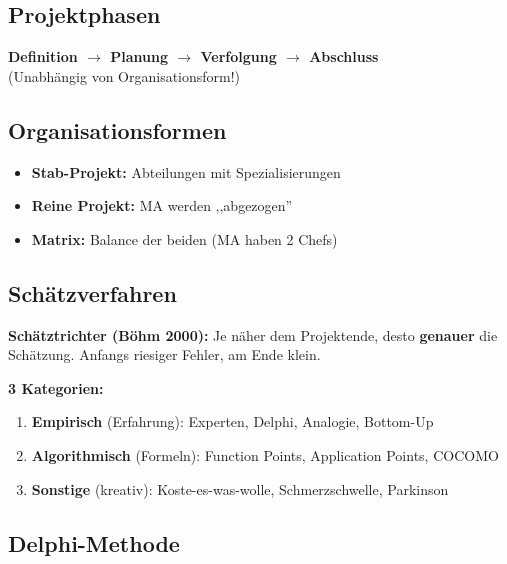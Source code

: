 \documentclass[11pt,a4paper]{article}
\begin{document}
\subsection{Projektphasen}

\begin{keyfacts}
\textbf{Definition $\rightarrow$ Planung $\rightarrow$ Verfolgung $\rightarrow$ Abschluss}\\
(Unabhängig von Organisationsform!)
\end{keyfacts}

\subsection{Organisationsformen}

\begin{keyfacts}
\begin{itemize}
  \item \textbf{Stab-Projekt:} Abteilungen mit Spezialisierungen
  \item \textbf{Reine Projekt:} MA werden ,,abgezogen''
  \item \textbf{Matrix:} Balance der beiden (MA haben 2 Chefs)
\end{itemize}
\end{keyfacts}

\subsection{Schätzverfahren}

\begin{story}
\textbf{Schätztrichter (Böhm 2000):} Je näher dem Projektende, desto \textbf{genauer} die Schätzung. Anfangs riesiger Fehler, am Ende klein.
\end{story}

\begin{keyfacts}
\textbf{3 Kategorien:}
\begin{enumerate}
  \item \textbf{Empirisch} (Erfahrung): Experten, Delphi, Analogie, Bottom-Up
  \item \textbf{Algorithmisch} (Formeln): Function Points, Application Points, COCOMO
  \item \textbf{Sonstige} (kreativ): Koste-es-was-wolle, Schmerzschwelle, Parkinson
\end{enumerate}
\end{keyfacts}

\subsection{Delphi-Methode}
\end{document}
